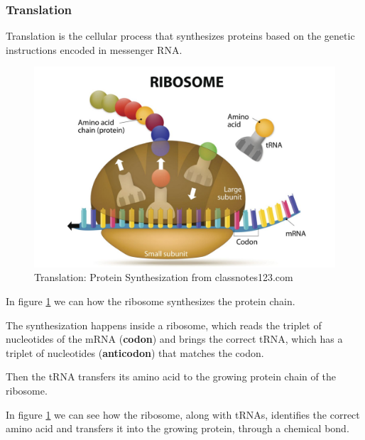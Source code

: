 \subsubsection{Translation}

Translation is the cellular process that synthesizes proteins based on the genetic instructions encoded in messenger RNA.

\begin{figure}[h!]
	\includegraphics[scale=.3]{res/proteins_overview/ribosome.png}
	\centering
	\caption{Translation: Protein Synthesization from classnotes123.com \cite{translation}}
	\label{fig:protein-synth}
\end{figure}

In figure \ref{fig:protein-synth} we can how the ribosome synthesizes the protein chain.

The synthesization happens inside a ribosome, which reads the triplet of nucleotides of the mRNA (\textbf{codon}) and brings the correct tRNA, which has a triplet of nucleotides (\textbf{anticodon}) that matches the codon.

Then the tRNA transfers its amino acid to the growing protein chain of the ribosome.

In figure \ref{fig:protein-synth} we can see how the ribosome, along with tRNAs, identifies the correct amino acid and transfers it into the growing protein, through a chemical bond.

